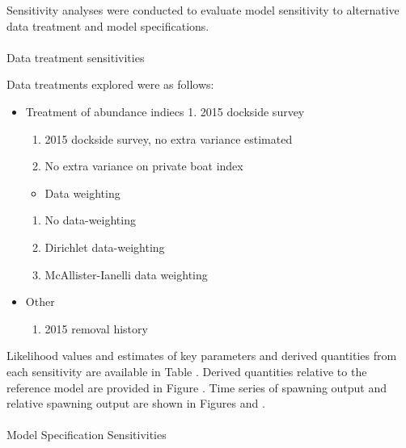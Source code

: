 \documentclass[
]{scrartcl}
\makeatletter
\let\oldparagraph\paragraph
\renewcommand{\paragraph}{
    \@ifstar
      \xxxParagraphStar
      \xxxParagraphNoStar
  }
\newcommand{\xxxParagraphStar}[1]{\oldparagraph*{#1}\mbox{}}
\newcommand{\xxxParagraphNoStar}[1]{\oldparagraph{#1}\mbox{}}
\providecommand{\tightlist}{%
  \setlength{\itemsep}{0pt}\setlength{\parskip}{0pt}}\usepackage{longtable,booktabs,array}
\makeatother
\begin{document}
Sensitivity analyses were conducted to evaluate model sensitivity to
alternative data treatment and model specifications.

\paragraph{Data treatment
sensitivities}\label{data-treatment-sensitivities}

Data treatments explored were as follows:

\begin{itemize}
\tightlist
\item
  Treatment of abundance indiecs 1. 2015 dockside survey

  \begin{enumerate}
  \def\labelenumi{\arabic{enumi}.}
  \setcounter{enumi}{1}
  \tightlist
  \item
    2015 dockside survey, no extra variance estimated
  \item
    No extra variance on private boat index
  \end{enumerate}

  \begin{itemize}
  \tightlist
  \item
    Data weighting
  \end{itemize}

  \begin{enumerate}
  \def\labelenumi{\arabic{enumi}.}
  \setcounter{enumi}{10}
  \tightlist
  \item
    No data-weighting
  \item
    Dirichlet data-weighting
  \item
    McAllister-Ianelli data weighting
  \end{enumerate}
\item
  Other

  \begin{enumerate}
  \def\labelenumi{\arabic{enumi}.}
  \setcounter{enumi}{13}
  \tightlist
  \item
    2015 removal history
  \end{enumerate}
\end{itemize}

Likelihood values and estimates of key parameters and derived quantities
from each sensitivity are available in Table . Derived quantities
relative to the reference model are provided in Figure . Time series of
spawning output and relative spawning output are shown in Figures and .

\paragraph{Model Specification Sensitivities}\label{senstivities}
\end{document}
